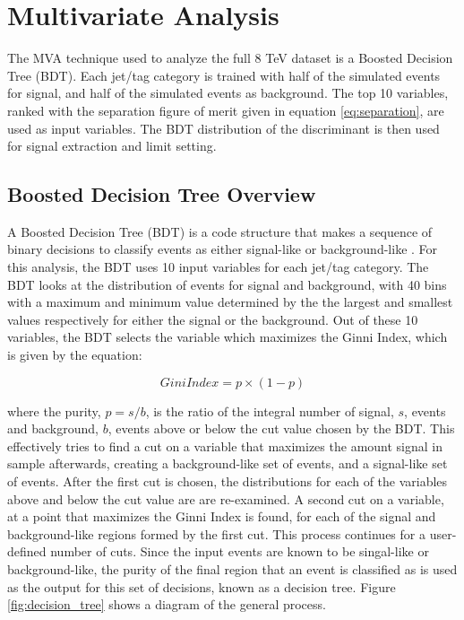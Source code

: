 \section{Multivariate Analysis}
\label{mva_II_overview}

\par The MVA technique used to analyze the full 8 TeV dataset is a
Boosted Decision Tree (BDT).  Each jet/tag category is trained with
half of the simulated \ttH events for signal, and half of the
simulated \ttjets events as background.  The top 10 variables, ranked
with the separation figure of merit given in equation
\ref{eq:separation}, are used as input variables.  The BDT
distribution of the discriminant is then used for signal extraction
and limit setting. 


\subsection{Boosted Decision Tree Overview}
\label{bdt_overview}

\par A Boosted Decision Tree (BDT) is a code structure that makes a
sequence of binary decisions to classify events as either signal-like
or background-like \cite{Hocker:2007ht}.  For this analysis, the BDT
uses 10 input variables for each jet/tag category.  The BDT looks at
the distribution of events for signal and background, with 40 bins
with a maximum and minimum value determined by the the largest and
smallest values respectively for either the signal or the background.
Out of these 10 variables, the BDT selects the variable which
maximizes the Ginni Index, which is given by the equation:

\begin{equation}\label{eq:gini_index}
Gini Index = p\times(1 - p)
\end{equation}

\noindent where the purity, $p=s/b$, is the ratio of the integral
number of signal, $s$, events and background, $b$, events above or
below the cut value chosen by the BDT.  This effectively tries to find
a cut on a variable that maximizes the amount signal in sample
afterwards, creating a background-like set of events, and a
signal-like set of events.  After the first cut is chosen, the
distributions for each of the variables above and below the cut value
are are re-examined.  A second cut on a variable, at a point that
maximizes the Ginni Index is found, for each of the signal and
background-like regions formed by the first cut.  This process
continues for a user-defined number of cuts.  Since the input events
are known to be singal-like or background-like, the purity of the
final region that an event is classified as is used as the output for
this set of decisions, known as a decision tree.  Figure
\ref{fig:decision_tree} shows a diagram of the general process.

